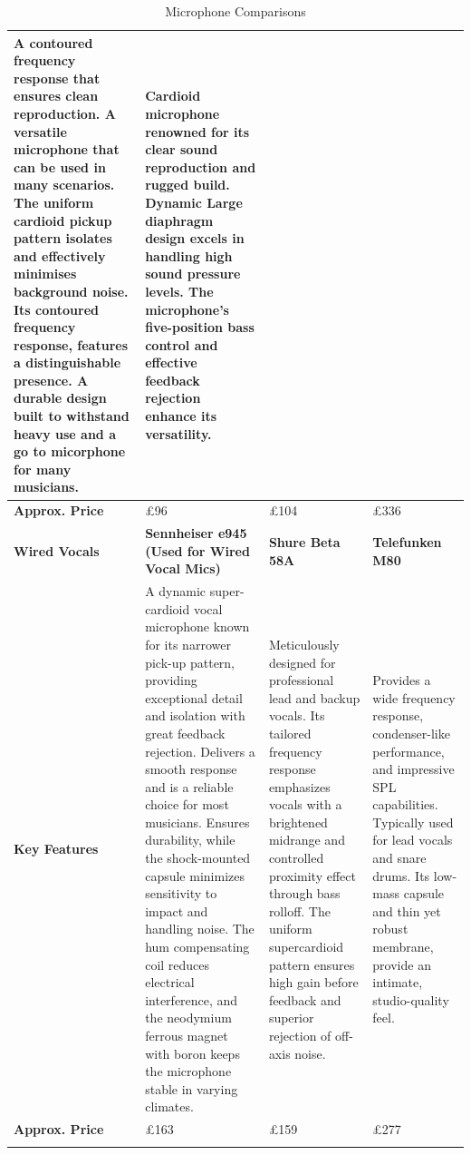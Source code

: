 \begin{longtable}[H]{|p{1.5cm}|p{4.8cm}|p{4.8cm}|p{4.8cm}|}
                      \cellcolor[HTML]{9AFF99}A contoured frequency response that ensures clean reproduction. A versatile microphone that can be used in many scenarios. The uniform cardioid pickup pattern isolates and effectively minimises background noise. Its contoured frequency response, features a distinguishable presence. A durable design built to withstand heavy use and a go to micorphone for many musicians. \citep{shuresm57} &
                      \cellcolor[HTML]{FFCCC9}Cardioid microphone renowned for its clear sound reproduction and rugged build. Dynamic Large diaphragm design excels in handling high sound pressure levels. The microphone's five-position bass control and effective feedback rejection enhance its versatility. \citep{sennheisermd421} \\ \hline
                    \textbf{Approx. Price} &
                      £96 &
                      £104 &
                      £336 \\ \hline
                    \textbf{Wired Vocals} &
                      \cellcolor[HTML]{9AFF99}\textbf{Sennheiser e945 (Used for Wired Vocal Mics)} &
                      \cellcolor[HTML]{FFCCC9}\textbf{Shure Beta 58A} &
                      \cellcolor[HTML]{FFCCC9}\textbf{Telefunken M80} \\ \hline
                    \textbf{Key Features} &
                      \cellcolor[HTML]{9AFF99}A dynamic super-cardioid vocal microphone known for its narrower pick-up pattern, providing exceptional detail and isolation with great feedback rejection. Delivers a smooth response and is a reliable choice for most musicians. Ensures durability, while the shock-mounted capsule minimizes sensitivity to impact and handling noise. The hum compensating coil reduces electrical interference, and the neodymium ferrous magnet with boron keeps the microphone stable in varying climates. \citep{sennheisere945} &
                      \cellcolor[HTML]{FFCCC9}Meticulously designed for professional lead and backup vocals. Its tailored frequency response emphasizes vocals with a brightened midrange and controlled proximity effect through bass rolloff. The uniform supercardioid pattern ensures high gain before feedback and superior rejection of off-axis noise. \citep{shurebeta58a} &
                      \cellcolor[HTML]{FFCCC9}Provides a wide frequency response, condenser-like performance, and impressive SPL capabilities. Typically used for lead vocals and snare drums. Its low-mass capsule and thin yet robust membrane, provide an intimate, studio-quality feel. \\ \hline
                    \textbf{Approx. Price} &
                      £163 &
                      £159 &
                      £277 \\ \hline
                    \caption{Microphone Comparisons}
                    \label{tab:mic_comparisons}
                \end{longtable}

